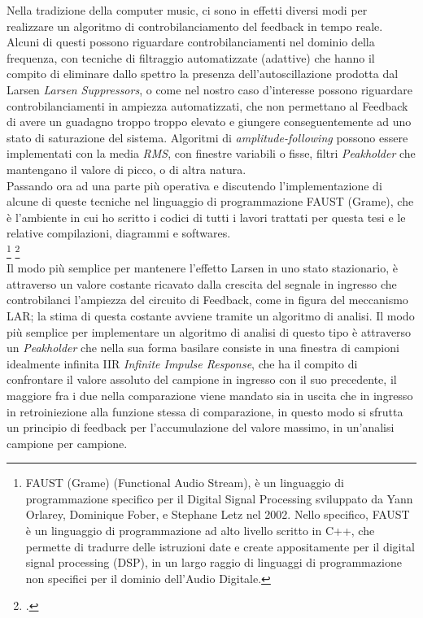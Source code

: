 Nella tradizione della computer music, ci sono in effetti
diversi modi per realizzare un algoritmo di controbilanciamento 
del feedback in tempo reale.
Alcuni di questi possono riguardare controbilanciamenti nel dominio della frequenza,
con tecniche di filtraggio automatizzate (adattive) che
hanno il compito di eliminare dallo spettro la presenza dell'autoscillazione prodotta dal Larsen \textit{Larsen Suppressors},
o come nel nostro caso d’interesse possono riguardare controbilanciamenti in ampiezza
automatizzati, che non permettano al Feedback di avere un guadagno troppo troppo elevato 
e giungere conseguentemente ad uno stato di saturazione del sistema.
Algoritmi di \textit{amplitude-following} possono essere implementati 
con la media \textit{RMS}, con finestre variabili o fisse, 
filtri \textit{Peakholder} che mantengano il valore di picco, o di altra natura. \\
Passando ora ad una parte più operativa e discutendo l'implementazione
di alcune di queste tecniche nel linguaggio di programmazione FAUST (Grame), 
che è l'ambiente in cui ho scritto i codici di tutti i lavori trattati
per questa tesi e le relative compilazioni, diagrammi e softwares. \\
\footnote{FAUST (Grame) (Functional Audio Stream), 
è un linguaggio di programmazione specifico per il Digital Signal
Processing sviluppato da Yann Orlarey, Dominique Fober, e Stephane Letz nel
2002. Nello specifico, FAUST è un linguaggio di programmazione ad alto livello
scritto in C++, che permette di tradurre delle istruzioni date e create 
appositamente per il digital signal processing (DSP), in un largo raggio di linguaggi
di programmazione non specifici per il dominio dell’Audio Digitale.} \footcite{https://faust.grame.fr/} \\
Il modo più semplice per mantenere l’effetto Larsen in uno stato stazionario, è attraverso un
valore costante ricavato dalla crescita del segnale in ingresso 
che controbilanci l’ampiezza del circuito di Feedback, come in figura del meccanismo LAR;
la stima di questa costante avviene tramite un algoritmo di analisi.
Il modo più semplice per implementare un algoritmo di analisi di questo tipo
è attraverso un \textit{Peakholder} che nella sua forma basilare consiste in una finestra 
di campioni idealmente infinita IIR \textit{Infinite Impulse Response},
che ha il compito di confrontare il valore assoluto del campione in ingresso con il suo precedente,
il maggiore fra i due nella comparazione viene mandato sia in uscita che in ingresso 
in retroiniezione alla funzione stessa di comparazione, 
in questo modo si sfrutta un principio di feedback per l'accumulazione
del valore massimo, in un'analisi campione per campione.

